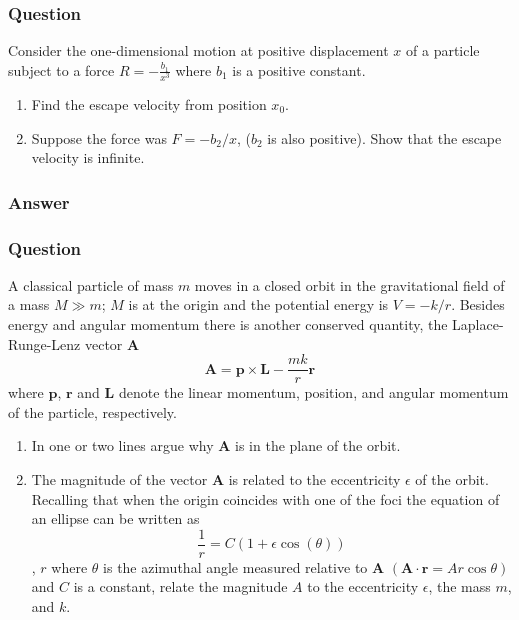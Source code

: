 \subsubsection{Question}
Consider the one-dimensional motion at positive displacement $x$ of a particle subject to a force $R = - \frac{b_1}{x^3} $ where $b_1$ is a positive constant.
\begin{enumerate}
	\item Find the escape velocity from position $x_0$.
	\item Suppose the force was $F = - b_2/x$, ($b_2$ is also positive). Show that the escape velocity is infinite.
\end{enumerate}
\subsubsection{Answer}


\subsubsection{Question}
A classical particle of mass $m$ moves in a closed orbit in the gravitational field of a mass $M \gg m$; $M$ is at the origin and the potential energy is $V = -k/r$. Besides energy and angular momentum there is another conserved quantity, the Laplace-Runge-Lenz vector $\mathbf{A}$
\begin{equation*}
	\mathbf{A} = \mathbf{p}\times\mathbf{L}-\frac{mk}{r}\mathbf{r}
\end{equation*}
where $\mathbf{p}$, $\mathbf{r}$ and $\mathbf{L}$ denote the linear momentum, position, and angular momentum of the particle, respectively.
\begin{enumerate}
	\item In one or two lines argue why $\mathbf{A}$ is in the plane of the orbit.
	\item The magnitude of the vector $\mathbf{A}$ is related to the eccentricity $\epsilon$ of the orbit. Recalling that when the origin coincides with one of the foci the equation of an ellipse can be written as $$\frac{1}{r} = C(1 + \epsilon \cos(\theta))$$, $r$ where $\theta$ is the azimuthal angle measured relative to $\mathbf{A}$ $(\mathbf{A}\cdot\mathbf{r}= Ar\cos\theta)$ and $C$ is a constant, relate the magnitude $A$ to the eccentricity $\epsilon$, the mass $m$, and $k$.
\end{enumerate}

